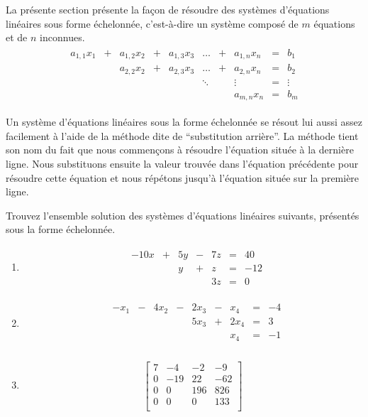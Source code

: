 \documentclass[]{book}
\providecommand{\tightlist}{%
  \setlength{\itemsep}{0pt}\setlength{\parskip}{0pt}}
\theoremstyle{definition}
\theoremstyle{definition}
\theoremstyle{definition}
\theoremstyle{remark}
\let\BeginKnitrBlock\begin \let\EndKnitrBlock\end
\begin{document}
La présente section présente la façon de résoudre des systèmes d'équations linéaires sous forme échelonnée, c'est-à-dire un système composé de \(m\) équations et de \(n\) inconnues.
\begin{align*}
\begin{array}{cccccccccc}
a_{1,1}x_1 & +& a_{1,2}x_2 & +&  a_{1,3}x_3 & \ldots & +&  a_{1,n}x_n & =& b_1  \\
        & & a_{2,2}x_2 & +&  a_{2,3}x_3 & \ldots & +& a_{2,n}x_n & =& b_2  \\
        & &         & &    & \ddots & & \vdots & =& \vdots   \\
       & &         & &          &        & & a_{m,n}x_n & =& b_m
\end{array}
\end{align*}

Un système d'équations linéaires sous la forme échelonnée se résout lui aussi assez facilement à l'aide de la méthode dite de ``substitution arrière''. La méthode tient son nom du fait que nous commençons à résoudre l'équation située à la dernière ligne. Nous substituons ensuite la valeur trouvée dans l'équation précédente pour résoudre cette équation et nous répétons jusqu'à l'équation située sur la première ligne.

\BeginKnitrBlock{example}
\protect\hypertarget{exm:unnamed-chunk-18}{}{\label{exm:unnamed-chunk-18} }Trouvez l'ensemble solution des systèmes d'équations linéaires suivants, présentés sous la forme échelonnée.

\begin{enumerate}
\def\labelenumi{\alph{enumi}.}
\tightlist
\item
  \begin{align*}
  \begin{array}{cccccccc}
  &-10x&+&5y&-&7z&=&40 \\
  &&&y&+&z&=&-12 \\
  &&&&&3z&=&0
  \end{array}
  \end{align*}
\item
  \begin{align*}
  \begin{array}{cccccccccc}
  &-x_{1}&-&4x_{2}&-&2x_{3}&-&x_{4}&=&-4\\
  &&&&&5x_{3}&+&2x_{4}&=&3\\
  &&&&&&&x_{4}&=&-1\\
  \end{array}
  \end{align*}
\item
  \begin{align*}
  \left[\begin{array}{ccc|c}
  7&-4&-2&-9\\
  0&-19&22&-62\\
  0&0&196&826\\
  0&0&0&133\\
  \end{array}\right]
  \end{align*}
\end{enumerate}
\EndKnitrBlock{example}
\end{document}
